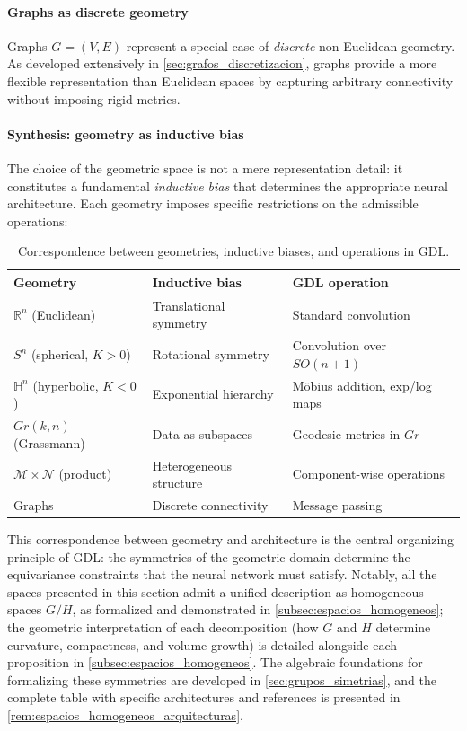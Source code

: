 \paragraph{Graphs as discrete geometry}

Graphs $G = (V, E)$ represent a special case of \textit{discrete} non-Euclidean geometry. As developed extensively in \autoref{sec:grafos_discretizacion}, graphs provide a more flexible representation than Euclidean spaces by capturing arbitrary connectivity without imposing rigid metrics.

\paragraph{Synthesis: geometry as inductive bias}

The choice of the geometric space is not a mere representation detail: it constitutes a fundamental \textit{inductive bias} that determines the appropriate neural architecture. Each geometry imposes specific restrictions on the admissible operations:

\begin{table}[htbp]
\centering
\small
\caption{Correspondence between geometries, inductive biases, and operations in GDL.}
\label{tab:geometria_sesgo_operacion}
\begin{tabular}{@{}lll@{}}
    \toprule
    \textbf{Geometry} & \textbf{Inductive bias} & \textbf{GDL operation} \\
    \midrule
    $\mathbb{R}^n$ (Euclidean) & Translational symmetry & Standard convolution \\
    $S^n$ (spherical, $K>0$) & Rotational symmetry & Convolution over $SO(n{+}1)$ \\
    $\mathbb{H}^n$ (hyperbolic, $K<0$) & Exponential hierarchy & Möbius addition, exp/log maps \\
    $Gr(k,n)$ (Grassmann) & Data as subspaces & Geodesic metrics in $Gr$ \\
    $\mathcal{M} \times \mathcal{N}$ (product) & Heterogeneous structure & Component-wise operations \\
    Graphs & Discrete connectivity & Message passing \\
    \bottomrule
\end{tabular}
\end{table}

This correspondence between geometry and architecture is the central organizing principle of \gls{GDL}: the symmetries of the geometric domain determine the equivariance constraints that the neural network must satisfy. Notably, all the spaces presented in this section admit a unified description as homogeneous spaces $G/H$, as formalized and demonstrated in \autoref{subsec:espacios_homogeneos}; the geometric interpretation of each decomposition (how $G$ and $H$ determine curvature, compactness, and volume growth) is detailed alongside each proposition in \autoref{subsec:espacios_homogeneos}. The algebraic foundations for formalizing these symmetries are developed in \autoref{sec:grupos_simetrias}, and the complete table with specific architectures and references is presented in \autoref{rem:espacios_homogeneos_arquitecturas}.
